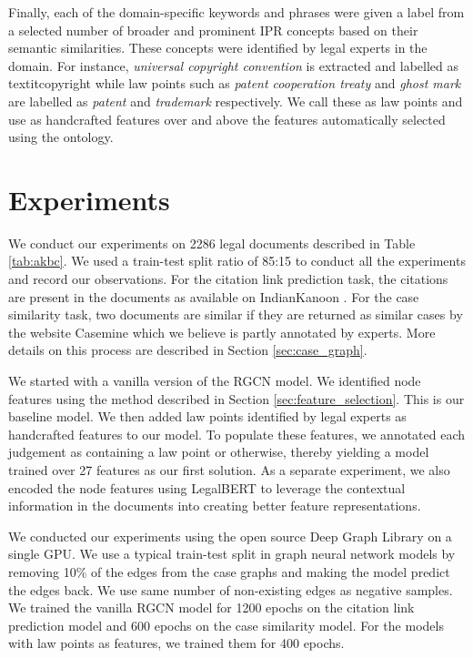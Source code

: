 \documentclass[12pt]{ceurart}
\begin{document}
Finally, each of the domain-specific keywords and phrases were given a label from a selected number of broader and prominent IPR concepts based on their semantic similarities. These concepts were identified by legal experts in the domain. For instance, \textit{universal copyright convention} is extracted and labelled as textit{copyright} while law points such as \textit{patent cooperation treaty} and \textit{ghost mark} are labelled as \textit{patent} and \textit{trademark} respectively. We call these as law points and use as handcrafted features over and above the features automatically selected using the ontology.

\section{Experiments}
\label{sec:experiments}

We conduct our experiments on 2286 legal documents described in Table \ref{tab:akbc}. We used a train-test split ratio of 85:15 to conduct all the experiments and record our observations. For the citation link prediction task, the citations are present in the documents as available on IndianKanoon \cite{ikanoon}. For the case similarity task, two documents are similar if they are returned as similar cases by the website Casemine \cite{casemine} which we believe is partly annotated by experts. More details on this process are described in Section \ref{sec:case_graph}.

We started with a vanilla version of the RGCN model. We identified node features using the method described in Section \ref{sec:feature_selection}. This is our baseline model. We then added law points identified by legal experts as handcrafted features to our model. To populate these features, we annotated each judgement as containing a law point or otherwise, thereby yielding a model trained over 27 features as our first solution. As a separate experiment, we also encoded the node features using LegalBERT to leverage the contextual information in the documents into creating better feature representations.

We conducted our experiments using the open source Deep Graph Library \cite{wang2019dgl} on a single GPU. We use a typical train-test split in graph neural network models by removing 10\% of the edges from the case graphs and making the model predict the edges back. We use same number of non-existing edges as negative samples. We trained the vanilla RGCN model for 1200 epochs on the citation link prediction model and 600 epochs on the case similarity model. For the models with law points as features, we trained them for 400 epochs.
\end{document}
